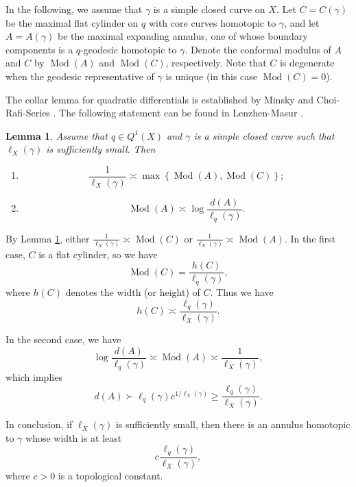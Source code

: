 \documentclass{amsart}
\theoremstyle{plain}
\newtheorem{lemma}[theorem]{Lemma}
\theoremstyle{definition}
\numberwithin{equation}{section}
\begin{document}
In the following, we assume that $\gamma$ is a simple closed curve on $X$. Let $C=C(\gamma)$ be the maximal flat cylinder on
$q$ with core curves homotopic to $\gamma$, and let $A=A(\gamma)$ be the maximal expanding annulus,  one of whose boundary components is a $q$-geodesic homotopic to $\gamma$.  
Denote the conformal modulus of $A$ and $C$ by $\operatorname{Mod}(A)$
and $\operatorname{Mod}(C)$, respectively. Note that $C$ is degenerate when the
 geodesic representative of $\gamma$ is unique (in this case $\operatorname{Mod}(C)=0$).  
 
 The collar lemma for quadratic differentials is established by Minsky
 \cite{Minsky92} and Choi-Rafi-Series \cite{CRS08}. The following statement can be found in Lenzhen-Masur \cite[Lemma 1]{LM2010}.
  

\begin{lemma}\label{lem:annulus}
  Assume that $q\in Q^1(X)$ and $\gamma$ is a simple closed curve such that $\ell_X(\gamma)$ is sufficiently small. Then  
  \begin{enumerate}
      \item[(1)]  $$\frac{1}{\ell_X(\gamma)} \asymp \max\left\{ \operatorname{Mod}(A), \operatorname{Mod}(C)\right\};$$
      \item[(2)] $$\operatorname{Mod}(A) \asymp \log \frac{d(A)}{\ell_q(\gamma)}.$$
  \end{enumerate}
\end{lemma}

By Lemma \ref{lem:annulus},
either $\frac{1}{\ell_X(\gamma)} \asymp \operatorname{Mod}(C)$
or $\frac{1}{\ell_X(\gamma)} \asymp \operatorname{Mod}(A)$. 
In the first case, $C$ is a flat cylinder, so we have $$\operatorname{Mod}(C)= \frac{h(C)}{\ell_q(\gamma)},$$ where $h(C)$ denotes the width (or height) of $C$. 
Thus we have 
\begin{equation*}\label{equ:flat}
h(C) \asymp \frac{\ell_q(\gamma)}{\ell_X(\gamma)}.
\end{equation*}

In the second case, we have 
\begin{equation*}\label{equ:expanding}
    \log \frac{d(A)}{\ell_q(\gamma)} \asymp \operatorname{Mod}(A)\asymp \frac{1}{\ell_X(\gamma)},
\end{equation*}
which implies 
$$d(A) \succ \ell_q(\gamma) e^{1/\ell_X(\gamma)} \geq \frac{\ell_q(\gamma)}{\ell_X(\gamma)}.$$

In conclusion, if $\ell_X(\gamma)$ is sufficiently small, then there is an annulus homotopic to $\gamma$ 
whose width is at least 
\begin{equation}\label{equ:width}
c \frac{\ell_q(\gamma)}{\ell_X(\gamma)},
\end{equation}
where $c>0$ is a topological constant. 
\end{document}
